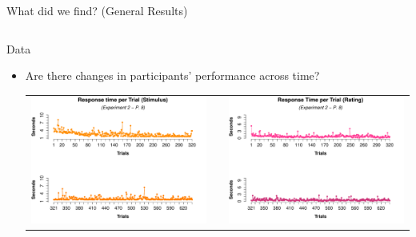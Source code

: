 \documentclass[final]{beamer}
\newlength{\onecolwid}
\newlength{\twocolwid}
\begin{document}
\begin{frame}[t]
\begin{columns}[t]
\begin{column}{\twocolwid}
\begin{alertblock}{What did we find? (General Results)}
\end{alertblock} 

\setlength{\onecolwid}{0.24\paperwidth}
\begin{columns}[t,totalwidth=\twocolwid] %
\begin{column}{\onecolwid}\vspace{-.6in} %


\begin{alertblock}{Data}


\begin{itemize}
\item Are there changes in participants' performance across time?

\begin{center}
\begin{tabular}{ccc}
\includegraphics[width=0.49\linewidth]{Figures/4_RT_St.pdf} & \hfill & \includegraphics[width=0.49\linewidth]{Figures/4_RT_CR.pdf}
\end{tabular}
\end{center}



\end{itemize}
\end{alertblock}
\end{column}
\end{columns}
\end{column}
\end{columns}
\end{frame}
\end{document}
